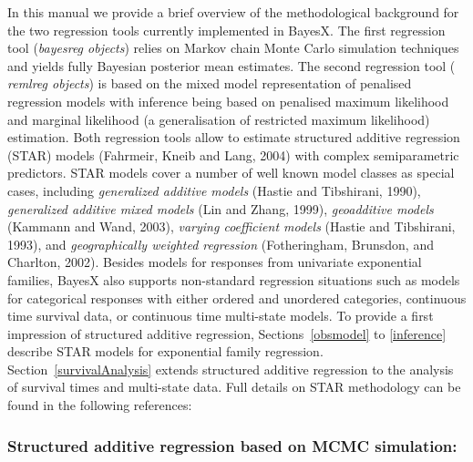 \documentclass[11pt,a4paper,twoside]{bayesxarticle}
\begin{document}
In this manual we provide a brief overview of the methodological
background for the two regression tools currently implemented in
BayesX. The first regression tool ({\em bayesreg objects}) relies on
Markov chain Monte Carlo simulation techniques and yields fully
Bayesian posterior mean estimates. The second regression tool ({\em
remlreg objects}) is based on the mixed model representation of
penalised regression models with inference being based on penalised
maximum likelihood and marginal likelihood (a generalisation of
restricted maximum likelihood) estimation. Both regression tools
allow to estimate structured additive regression (STAR) models
(Fahrmeir, Kneib and Lang, 2004) with complex semiparametric
predictors. STAR models cover a number of well known model classes
as special cases, including {\em generalized additive models}
(Hastie and Tibshirani, 1990), {\em generalized additive mixed
models} (Lin and Zhang, 1999), {\em geoadditive models} (Kammann and
Wand, 2003), {\em varying coefficient models} (Hastie and
Tibshirani, 1993), and {\em geographically weighted regression}
(Fotheringham, Brunsdon, and Charlton, 2002). Besides models for
responses from univariate exponential families, BayesX also supports
non-standard regression situations such as models for categorical
responses with either ordered and unordered categories, continuous
time survival data, or continuous time multi-state models. To
provide a first impression of structured additive regression,
Sections~\ref{obsmodel} to \ref{inference} describe STAR models for
exponential family regression. Section~\ref{survivalAnalysis}
extends structured additive regression to the analysis of survival
times and multi-state data. Full details on STAR methodology can be
found in the following references:

\subsubsection*{Structured additive regression based on MCMC
simulation:}
\end{document}
